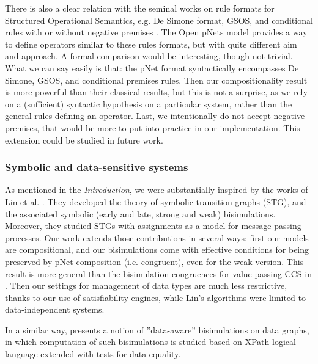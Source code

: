 \documentclass{elsarticle}
\begin{document}
There is also a clear relation with the seminal works on rule formats for Structured Operational Semantics, e.g. De Simone format, GSOS, and conditional rules with or without negative premises \cite{deSimone85,Bloom:1995,GROOTE1992202,VANGLABBEEK2004229}.  The Open pNets model provides a way to define operators similar to these rules formats, but with quite different aim and approach. A formal comparison would be interesting, though not trivial. What we can say easily is that: the pNet format syntactically encompasses  De Simone, GSOS, and conditional premises rules. Then our compositionality result is more powerful than their classical results, but this is not a surprise, as we rely on a (sufficient) syntactic hypothesis on a particular system, rather than the general rules defining an operator.  Last, we intentionally do not accept negative premises, that would be more  to put into practice in our implementation. This extension could be studied in future work.

\subsubsection*{Symbolic and data-sensitive systems}
 As mentioned in the \emph{Introduction}, we were substantially inspired by the works  of Lin et al. \cite{IngolfsdottirL:2001,HennessyLin:TCS95,Lin:96}. They developed the theory of symbolic transition graphs (STG), and the associated symbolic (early and late, strong and weak) bisimulations. Moreover, they studied STGs with assignments as a model for message-passing processes. Our work extends those contributions in several ways: first our models are compositional, and our bisimulations come with effective conditions for being preserved by pNet composition (i.e. congruent), even for the weak version. This result is more general than the bisimulation congruences for value-passing CCS in \cite{IngolfsdottirL:2001}. Then our settings for management of data types are much less restrictive, thanks to our use of satisfiability engines, while Lin's algorithms were limited to data-independent systems. 

In a similar way, \cite{Abriola:2018} presents a notion of ''data-aware'' bisimulations on data graphs, in which computation of such bisimulations is studied based on XPath logical language extended with tests for data equality.

\end{document}
